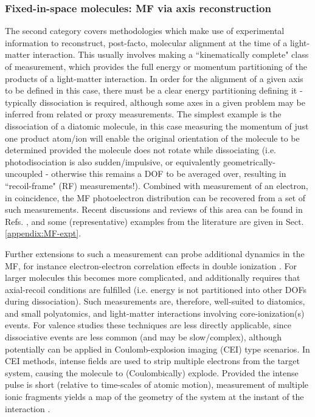 \documentclass[10pt]{article}
\begin{document}
\subsubsection{Fixed-in-space molecules: MF via axis reconstruction\label{sec:fixed-in-space}}

The second category covers methodologies which make use of experimental information to reconstruct, post-facto, molecular alignment at the time of a light-matter interaction. This usually involves making a ``kinematically complete" class of measurement, which provides the full energy or momentum partitioning of the products of a light-matter interaction. In order for the alignment of a given axis to be defined in this case, there must be a clear energy partitioning defining it - typically dissociation is required, although some axes in a given problem may be inferred from related or proxy measurements. The simplest example is the dissociation of a diatomic molecule, in this case measuring the momentum of just one product atom/ion will enable the original orientation of the molecule to be determined 
provided the molecule does not rotate while dissociating (i.e. photodisociation is also sudden/impulsive, or equivalently geometrically-uncoupled - otherwise this remains a DOF to be averaged over, resulting in ``recoil-frame" (RF) measurements!). Combined with measurement of an electron, in coincidence, the MF photoelectron distribution can be recovered from a set of such measurements. Recent discussions and reviews of this area can be found in Refs. \cite{Yagishita2005,Reid2012,dowek2012PhotoionizationDynamicsPhotoemission,Yagishita2015,jahnke2022PhotoelectronDiffraction}, and some (representative) examples from the literature are given in Sect. \ref{appendix:MF-expt}.


Further extensions to such a measurement can probe additional dynamics in the MF, for instance electron-electron correlation effects in double ionization \cite{Akoury2007}. %
For larger molecules this becomes more complicated, and additionally requires that axial-recoil conditions are fulfilled (i.e. energy is not partitioned into other DOFs during dissociation). Such measurements are, therefore, well-suited to diatomics, and small polyatomics, and light-matter interactions involving core-ionization(s) events. For valence studies these techniques are less directly applicable, since dissociative events are less common (and may be slow/complex), although potentially can be applied in Coulomb-explosion imaging (CEI) type scenarios. In CEI methods, intense fields are used to strip multiple electrons from the target system, causing the molecule to (Coulombically) explode. Provided the intense pulse is short (relative to time-scales of atomic motion), measurement of multiple ionic fragments yields a map of the geometry of the system at the instant of the interaction \cite{stapelfeldt1998TimeresolvedCoulombExplosion,Underwood2015,Slater2015}. 
\end{document}
